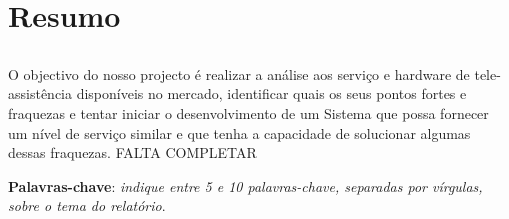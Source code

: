 \chapter{Resumo}
\section*{\textit{\TITULO}}

O objectivo do nosso projecto é realizar a análise aos serviço e hardware de tele-assistência disponíveis no mercado, identificar quais os seus pontos fortes e fraquezas e tentar iniciar o desenvolvimento de um Sistema que possa fornecer um nível de serviço similar e que tenha a capacidade de solucionar algumas dessas fraquezas. FALTA COMPLETAR

\textbf{Palavras-chave}: \textit{indique entre 5 e 10 palavras-chave, separadas por vírgulas, sobre o tema do relatório}.